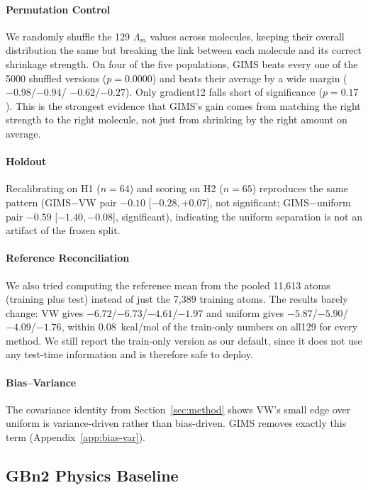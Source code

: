 \documentclass{article}
\begin{document}
\paragraph{Permutation Control} We randomly shuffle the 129 $\Lambda_m$ values
across molecules, keeping their overall distribution the same but breaking
the link between each molecule and its correct shrinkage strength. On four
of the five populations, GIMS beats every one of the 5000 shuffled versions
($p=0.0000$) and beats their average by a wide margin ($-0.98$/$-0.94$/
$-0.62$/$-0.27$). Only gradient12 falls short of significance ($p=0.17$). This
is the strongest evidence that GIMS's gain comes from matching the right
strength to the right molecule, not just from shrinking by the right amount
on average.

\paragraph{Holdout} Recalibrating on H1 ($n=64$) and scoring on H2 ($n=65$)
reproduces the same pattern (GIMS$-$VW pair $-0.10$ [$-0.28,+0.07$], not
significant; GIMS$-$uniform pair $-0.59$ [$-1.40,-0.08$], significant),
indicating the uniform separation is not an artifact of the frozen split.

\paragraph{Reference Reconciliation}\label{para:ref-reconciliation} We also tried computing the reference
mean from the pooled 11{,}613 atoms (training plus test) instead of just
the 7{,}389 training atoms. The results barely change: VW gives
$-6.72$/$-6.73$/$-4.61$/$-1.97$ and uniform gives
$-5.87$/$-5.90$/$-4.09$/$-1.76$, within 0.08~kcal/mol of the train-only
numbers on all129 for every method. We still report the train-only version as
our default, since it does not use any test-time information and is
therefore safe to deploy.

\paragraph{Bias--Variance} The covariance identity from Section~\ref{sec:method}
shows VW's small edge over uniform is variance-driven rather than
bias-driven. GIMS removes exactly this term (Appendix~\ref{app:bias-var}).

\subsection{GBn2 Physics Baseline}
\end{document}
